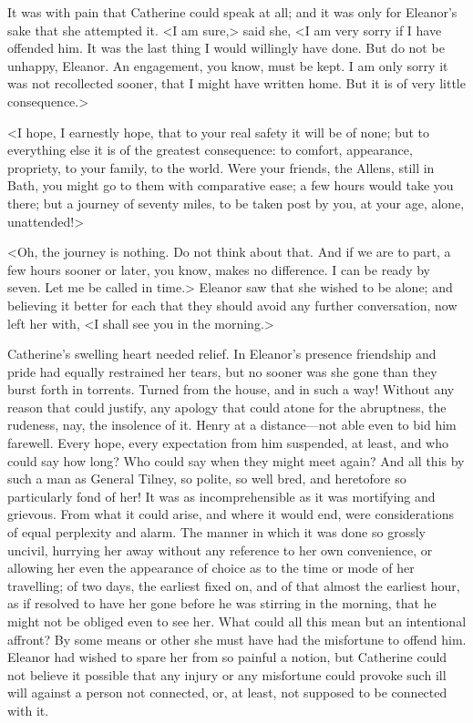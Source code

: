  It was with pain that Catherine could speak at all; and it was only for Eleanor's sake that she attempted it. <I am sure,> said she, <I am very sorry if I have offended him. It was the last thing I would willingly have done. But do not be unhappy, Eleanor. An engagement, you know, must be kept. I am only sorry it was not recollected sooner, that I might have written home. But it is of very little consequence.> 

 <I hope, I earnestly hope, that to your real safety it will be of none; but to everything else it is of the greatest consequence: to comfort, appearance, propriety, to your family, to the world. Were your friends, the Allens, still in Bath, you might go to them with comparative ease; a few hours would take you there; but a journey of seventy miles, to be taken post by you, at your age, alone, unattended!> 

 <Oh, the journey is nothing. Do not think about that. And if we are to part, a few hours sooner or later, you know, makes no difference. I can be ready by seven. Let me be called in time.> Eleanor saw that she wished to be alone; and believing it better for each that they should avoid any further conversation, now left her with, <I shall see you in the morning.> 

 Catherine's swelling heart needed relief. In Eleanor's presence friendship and pride had equally restrained her tears, but no sooner was she gone than they burst forth in torrents. Turned from the house, and in such a way! Without any reason that could justify, any apology that could atone for the abruptness, the rudeness, nay, the insolence of it. Henry at a distance—not able even to bid him farewell. Every hope, every expectation from him suspended, at least, and who could say how long? Who could say when they might meet again? And all this by such a man as General Tilney, so polite, so well bred, and heretofore so particularly fond of her! It was as incomprehensible as it was mortifying and grievous. From what it could arise, and where it would end, were considerations of equal perplexity and alarm. The manner in which it was done so grossly uncivil, hurrying her away without any reference to her own convenience, or allowing her even the appearance of choice as to the time or mode of her travelling; of two days, the earliest fixed on, and of that almost the earliest hour, as if resolved to have her gone before he was stirring in the morning, that he might not be obliged even to see her. What could all this mean but an intentional affront? By some means or other she must have had the misfortune to offend him. Eleanor had wished to spare her from so painful a notion, but Catherine could not believe it possible that any injury or any misfortune could provoke such ill will against a person not connected, or, at least, not supposed to be connected with it. 

